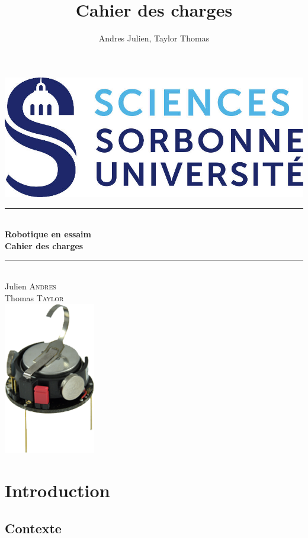 \documentclass[a4paper]{article}
\title{Cahier des charges}
\author{Andres Julien, Taylor Thomas}
\date{}
\newcommand{\HRule}{\rule{\linewidth}{0.5mm}} %
\begin{document}
\begin{titlepage}
\center

\includegraphics{incl/logo_sorbonne}\\[1cm] 

\HRule \\[0.4cm]
{ \huge \bfseries Robotique en essaim }\\
{ \huge \bfseries Cahier des charges}\\[0.4cm] %
\HRule \\[1.5cm]



Julien \textsc{Andres}\\ %
Thomas \textsc{Taylor}\\[3cm]

\includegraphics[width=4cm]{incl/Kilobots.png}



\end{titlepage}

\newpage
\renewcommand{\contentsname}{Sommaire}
\tableofcontents
\newpage
\section{Introduction}
\subsection{Contexte}
\end{document}
